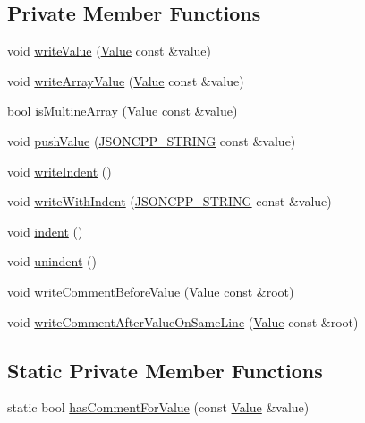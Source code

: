 \subsection*{Private Member Functions}
\begin{DoxyCompactItemize}
\item 
void \hyperlink{structJson_1_1BuiltStyledStreamWriter_a7c9da861861e570a51b45f270c9ff150}{write\+Value} (\hyperlink{classJson_1_1Value}{Value} const \&value)
\item 
void \hyperlink{structJson_1_1BuiltStyledStreamWriter_acd20e9274bbcf7876ef3af2e7d23a31f}{write\+Array\+Value} (\hyperlink{classJson_1_1Value}{Value} const \&value)
\item 
bool \hyperlink{structJson_1_1BuiltStyledStreamWriter_af423fd33b3d580506ea3efc53b05a077}{is\+Multine\+Array} (\hyperlink{classJson_1_1Value}{Value} const \&value)
\item 
void \hyperlink{structJson_1_1BuiltStyledStreamWriter_a91e8535508412eea04d77c0cafdf15aa}{push\+Value} (\hyperlink{json_8hpp_a1e723f95759de062585bc4a8fd3fa4be}{J\+S\+O\+N\+C\+P\+P\+\_\+\+S\+T\+R\+I\+NG} const \&value)
\item 
void \hyperlink{structJson_1_1BuiltStyledStreamWriter_a2b38a3714d415c4bd3b4812897130f3d}{write\+Indent} ()
\item 
void \hyperlink{structJson_1_1BuiltStyledStreamWriter_a6e80e1a0d5f64df2ec48c3c3b1284990}{write\+With\+Indent} (\hyperlink{json_8hpp_a1e723f95759de062585bc4a8fd3fa4be}{J\+S\+O\+N\+C\+P\+P\+\_\+\+S\+T\+R\+I\+NG} const \&value)
\item 
void \hyperlink{structJson_1_1BuiltStyledStreamWriter_a73e09692a2cfbd6e67836b060dc34a9f}{indent} ()
\item 
void \hyperlink{structJson_1_1BuiltStyledStreamWriter_a0da6c6f603e00c8c6e38af553edd8c55}{unindent} ()
\item 
void \hyperlink{structJson_1_1BuiltStyledStreamWriter_a32c4afca4e08fba79bb0a80a8010283a}{write\+Comment\+Before\+Value} (\hyperlink{classJson_1_1Value}{Value} const \&root)
\item 
void \hyperlink{structJson_1_1BuiltStyledStreamWriter_a89625b134fce0255263ca40e6125742b}{write\+Comment\+After\+Value\+On\+Same\+Line} (\hyperlink{classJson_1_1Value}{Value} const \&root)
\end{DoxyCompactItemize}
\subsection*{Static Private Member Functions}
\begin{DoxyCompactItemize}
\item 
static bool \hyperlink{structJson_1_1BuiltStyledStreamWriter_a457c2f3c1e8c952caeb60e52477d0c9a}{has\+Comment\+For\+Value} (const \hyperlink{classJson_1_1Value}{Value} \&value)
\end{DoxyCompactItemize}
